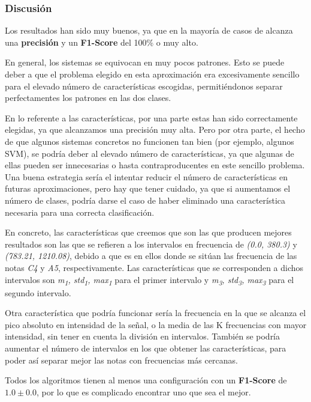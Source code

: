 \documentclass[12pt]{article}
\begin{document}
\subsubsection{Discusión}
Los resultados han sido muy buenos, ya que en la mayoría de casos de alcanza una \textbf{precisión} y un \textbf{F1-Score} del 100\% o muy alto. 

\bigskip
En general, los sistemas se equivocan en muy pocos patrones. Esto se puede deber a que el problema elegido en esta aproximación
era excesivamente sencillo para el elevado número de características escogidas, permitiéndonos separar perfectamentes los patrones
en las dos clases.

\bigskip
En lo referente a las características, por una parte estas han sido correctamente elegidas, ya que alcanzamos una precisión muy alta. Pero 
por otra parte, el hecho de que algunos sistemas concretos no 
funcionen tan bien (por ejemplo, algunos SVM), se podría deber al elevado número de características, 
ya que algunas de ellas pueden ser innecesarias o hasta contraproducentes en este sencillo problema. Una buena estrategia sería el intentar 
reducir el número de características en futuras aproximaciones, pero hay que tener cuidado, ya que si aumentamos el número de clases, 
podría darse el caso de haber eliminado una característica necesaria para una correcta clasificación.

En concreto, las características que creemos que son las que producen mejores resultados son las que se refieren a los intervalos 
en frecuencia de \textit{(0.0, 380.3)} y \textit{(783.21, 1210.08)}, debido a que es en ellos donde se sitúan las frecuencia de las notas 
\textit{C4} y \textit{A5}, respectivamente.
Las características que se corresponden a dichos intervalos son \textit{m\textsubscript{1}, std\textsubscript{1}, max\textsubscript{1}}
para el primer intervalo y \textit{m\textsubscript{3}, std\textsubscript{3}, max\textsubscript{3}} para el segundo intervalo.

Otra característica que podría funcionar sería la frecuencia en la que se alcanza el pico absoluto en intensidad de la señal,
o la media de las K frecuencias con mayor intensidad, sin tener en cuenta la división en intervalos. También se podría aumentar
el número de intervalos en los que obtener las características, para poder así separar mejor las notas con frecuencias más cercanas.

\bigskip
Todos los algoritmos tienen al menos una configuración con un \textbf{F1-Score} de $1.0 \pm 0.0$, por lo que es complicado encontrar uno que sea el mejor.
\end{document}
